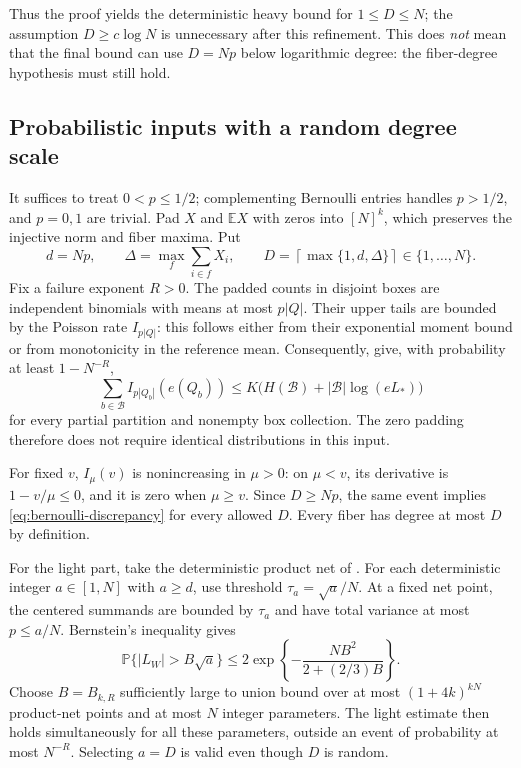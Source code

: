 \documentclass[11pt]{article}
\theoremstyle{spaced}
\theoremstyle{remark}
\numberwithin{equation}{section}
\newcommand{\E}{\mathbb E}
\newcommand{\Pp}{\mathbb P}
\begin{document}
Thus the proof yields the deterministic heavy bound for $1\leq D\leq N$; the assumption $D\geq c\log N$ is unnecessary after this refinement. This does \emph{not} mean that the final bound can use $D=Np$ below logarithmic degree: the fiber-degree hypothesis must still hold.

\subsection{Probabilistic inputs with a random degree scale}
It suffices to treat $0<p\leq1/2$; complementing Bernoulli entries handles $p>1/2$, and $p=0,1$ are trivial. Pad $X$ and $\E X$ with zeros into $[N]^k$, which preserves the injective norm and fiber maxima. Put
\[
 d=Np,\qquad
 \Delta=\max_f\sum_{i\in f}X_i,\qquad
 D=\left\lceil\max\{1,d,\Delta\}\right\rceil\in\{1,\ldots,N\}.
\]
Fix a failure exponent $R>0$. The padded counts in disjoint boxes are independent binomials with means at most $p|Q|$. Their upper tails are bounded by the Poisson rate $I_{p|Q|}$: this follows either from their exponential moment bound or from monotonicity in the reference mean. Consequently, \cite[proofs of Lemmas~4.4--4.5]{ZZ} give, with probability at least $1-N^{-R}$,
\[
 \sum_{b\in\mathcal B}I_{p|Q_b|}(e(Q_b))
 \leq K\bigl(H(\mathcal B)+|\mathcal B|\log(eL_*)\bigr)
\]
for every partial partition and nonempty box collection. The zero padding therefore does not require identical distributions in this input.

For fixed $v$, $I_\mu(v)$ is nonincreasing in $\mu>0$: on $\mu<v$, its derivative is $1-v/\mu\leq0$, and it is zero when $\mu\geq v$. Since $D\geq Np$, the same event implies \eqref{eq:bernoulli-discrepancy} for every allowed $D$. Every fiber has degree at most $D$ by definition.

For the light part, take the deterministic product net of \cite[Lemma~4.1]{ZZ}. For each deterministic integer $a\in[1,N]$ with $a\geq d$, use threshold $\tau_a=\sqrt a/N$. At a fixed net point, the centered summands are bounded by $\tau_a$ and have total variance at most $p\leq a/N$. Bernstein's inequality gives
\[
 \Pp\{|L_W|>B\sqrt a\}
 \leq 2\exp\left\{-\frac{N B^2}{2+(2/3)B}\right\}.
\]
Choose $B=B_{k,R}$ sufficiently large to union bound over at most $(1+4k)^{kN}$ product-net points and at most $N$ integer parameters. The light estimate then holds simultaneously for all these parameters, outside an event of probability at most $N^{-R}$. Selecting $a=D$ is valid even though $D$ is random.
\end{document}

